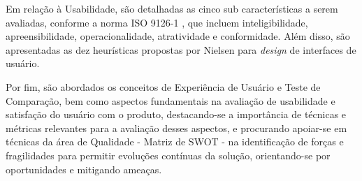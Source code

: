 Em relação à Usabilidade, são detalhadas as cinco sub características a serem avaliadas, conforme a norma ISO 9126-1 \cite{iso9126}, que incluem inteligibilidade, apreensibilidade, operacionalidade, 
atratividade e conformidade. Além disso, são apresentadas as dez heurísticas propostas por Nielsen para \textit{design} de interfaces de usuário. 

Por fim, são abordados os conceitos de Experiência de Usuário e Teste de Comparação, bem como aspectos fundamentais na avaliação de usabilidade e satisfação do usuário com o produto, 
destacando-se a importância de técnicas e métricas relevantes para a avaliação desses aspectos, e procurando apoiar-se em técnicas da área de Qualidade - Matriz de SWOT - na identificação de 
forças e fragilidades para permitir evoluções contínuas da solução, orientando-se por oportunidades e mitigando ameaças.
